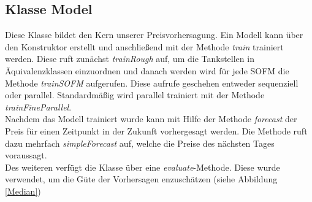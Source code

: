 \documentclass[11pt]{article}
\begin{document}
\subsection{Klasse Model}
	Diese Klasse bildet den Kern unserer Preisvorhersagung. Ein Modell kann über den Konstruktor erstellt und anschließend mit der Methode \textit{train} trainiert werden. Diese ruft zunächst \textit{trainRough} auf, um die Tankstellen in Äquivalenzklassen einzuordnen und danach werden wird für jede SOFM die Methode \textit{trainSOFM} aufgerufen. Diese aufrufe geschehen entweder sequenziell oder parallel. Standardmäßig wird parallel trainiert mit der Methode \textit{trainFineParallel}.\\
	Nachdem das Modell trainiert wurde kann mit Hilfe der Methode \textit{forecast} der Preis für einen Zeitpunkt in der Zukunft vorhergesagt werden. Die Methode ruft dazu mehrfach \textit{simpleForecast} auf, welche die Preise des nächsten Tages voraussagt.\\
	Des weiteren verfügt die Klasse über eine \textit{evaluate}-Methode. Diese wurde verwendet, um die Güte der Vorhersagen enzuschätzen (siehe Abbildung \ref{Median})
\end{document}
